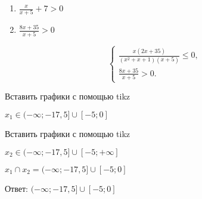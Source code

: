 \begin{enumerate}[{$2$}.$1$]
    \item $\frac{x}{x+5} + 7 > 0$
    \item $\frac{8x+35}{x+5} > 0$
\end{enumerate}


\begin{equation*}
    \begin{cases}
        \frac{x(2x+35)}{(x^2+x+1)(x+5)} \leqslant 0, \\
        \frac{8x+35}{x+5} > 0.
    \end{cases}
\end{equation*}

Вставить графики с помощью tikz

$x_1 \in (-\infty; -17,5]\cup[-5;0]$

Вставить графики с помощью tikz

$x_2 \in (-\infty; -17,5]\cup[-5; +\infty]$



$x_1 \cap x_2 = (-\infty; -17,5]\cup[-5;0]$

Ответ: $(-\infty; -17,5]\cup[-5;0]$


